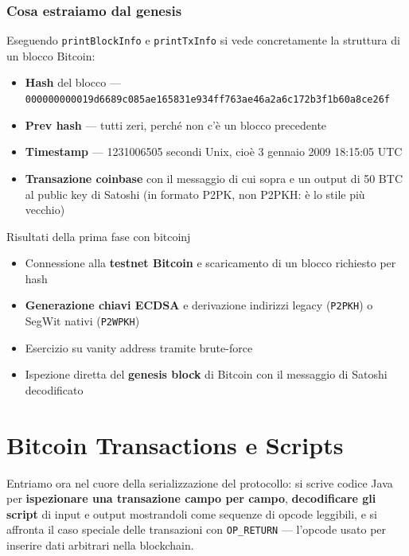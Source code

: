 \documentclass[
  italian,
  openany]{book}
\providecommand{\tightlist}{%
  \setlength{\itemsep}{0pt}\setlength{\parskip}{0pt}}
\begin{document}
\subsubsection{Cosa estraiamo dal
genesis}\label{cosa-estraiamo-dal-genesis}

Eseguendo \texttt{printBlockInfo} e \texttt{printTxInfo} si vede
concretamente la struttura di un blocco Bitcoin:

\begin{itemize}
\tightlist
\item
  \textbf{Hash} del blocco ---
  \texttt{000000000019d6689c085ae165831e934ff763ae46a2a6c172b3f1b60a8ce26f}
\item
  \textbf{Prev hash} --- tutti zeri, perché non c'è un blocco precedente
\item
  \textbf{Timestamp} --- 1231006505 secondi Unix, cioè 3 gennaio 2009
  18:15:05 UTC
\item
  \textbf{Transazione coinbase} con il messaggio di cui sopra e un
  output di 50 BTC al public key di Satoshi (in formato P2PK, non P2PKH:
  è lo stile più vecchio)
\end{itemize}

\begin{calloutnote}{Risultati della prima fase con bitcoinj}

\begin{itemize}
\tightlist
\item
  Connessione alla \textbf{testnet Bitcoin} e scaricamento di un blocco
  richiesto per hash
\item
  \textbf{Generazione chiavi ECDSA} e derivazione indirizzi legacy
  (\texttt{P2PKH}) o SegWit nativi (\texttt{P2WPKH})
\item
  Esercizio su vanity address tramite brute-force
\item
  Ispezione diretta del \textbf{genesis block} di Bitcoin con il
  messaggio di Satoshi decodificato
\end{itemize}

\end{calloutnote}

\section{Bitcoin Transactions e
Scripts}\label{bitcoin-transactions-e-scripts}

Entriamo ora nel cuore della serializzazione del protocollo: si scrive
codice Java per \textbf{ispezionare una transazione campo per campo},
\textbf{decodificare gli script} di input e output mostrandoli come
sequenze di opcode leggibili, e si affronta il caso speciale delle
transazioni con \texttt{OP\_RETURN} --- l'opcode usato per inserire dati
arbitrari nella blockchain.
\end{document}
